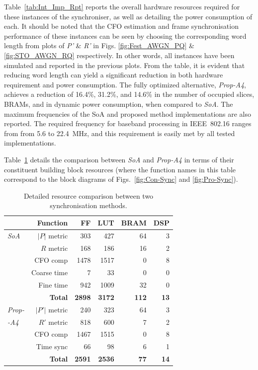 Table~\ref{tab:Int_Imp_Rpt} reports the overall hardware resources required for these instances of the synchroniser, as well as detailing the power consumption of each.
It should be noted that the CFO estimation and frame synchronisation performance of these instances can be seen by choosing the corresponding word length from plots of \emph{P'} \& \emph{R'} in Figs. \ref{fig:Fest_AWGN_PQ} \& \ref{fig:STO_AWGN_RQ} respectively. In other words, all instances have been simulated and reported in the previous plots.
From the table, it is evident that reducing word length can yield a significant reduction in both hardware requirement and power consumption.
The fully optimized alternative, \textit{Prop-A4}, achieves a reduction of 16.4\%, 31.2\%, and 14.6\% in the number of occupied slices, BRAMs, and in dynamic power consumption, when compared to \textit{SoA}.
The maximum frequencies of the SoA and proposed method implementations are also reported. 
The required frequency for baseband processing in IEEE~802.16 ranges from from 5.6 to 22.4~MHz, and this requirement is easily met by all tested implementations.

Table~\ref{tab:Imp_Rpt} details the comparison between \textit{SoA} and \textit{Prop-A4} in terms of their constituent building block resources (where the function names in this table correspond to the block diagrams of Figs.~\ref{fig:Con-Sync} and \ref{fig:Pro-Sync}).

\begin{table}[h]
	\centering
	\caption{ Detailed resource comparison between two synchronisation methods.}
	\label{tab:Imp_Rpt}
	\begin{tabular}{l|r|r|r|r|r}
       \hline \hline
    		  \multicolumn{2}{r|}{Function}			& {FF} & {LUT} & {BRAM} & {DSP} \\
    	\hline
		\textit{SoA}		&  $|P|$ metric		& 303 	& 427 	& 64 	& 3 	\\
						&  $R$ metric		& 168 	& 186 	& 16 	& 2	\\
						&  CFO comp		& 1478 	& 1517 	& 0	 	& 8	\\
						& Coarse time		& 7  	& 33  	& 0	 	& 0	\\
    						& Fine time			& 942  	& 1009  	& 32 	& 0	\\
						& \textbf{Total} & \textbf{2898} & \textbf{3172} & \textbf{112} & \textbf{13}\\
	\hline
		\textit{Prop-}		& $|P'|$ metric		& 240 	& 323 	& 64 	& 3 \\
		\textit{-A4}				& $R'$ metric		& 818 	& 600 	& 7		& 2 \\
						& CFO comp		& 1467 	& 1515 	& 0 		& 8 \\
						& Time sync			& 66	& 98	& 6 		& 1 \\
						& \textbf{Total} & \textbf{2591} & \textbf{2536} & \textbf{77} & \textbf{14}\\
    	\hline \hline
    \end{tabular}
\end{table}

